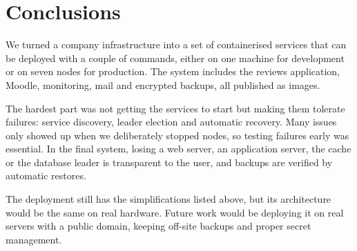 \documentclass[11pt,a4paper]{article}
\begin{document}
\section{Conclusions}

We turned a company infrastructure into a set of containerised services that can be
deployed with a couple of commands, either on one machine for development or on seven
nodes for production. The system includes the reviews application, Moodle, monitoring,
mail and encrypted backups, all published as images.

The hardest part was not getting the services to start but making them tolerate failures:
service discovery, leader election and automatic recovery. Many issues only showed up when
we deliberately stopped nodes, so testing failures early was essential. In the final
system, losing a web server, an application server, the cache or the database leader is
transparent to the user, and backups are verified by automatic restores.

The deployment still has the simplifications listed above, but its architecture would be
the same on real hardware. Future work would be deploying it on real servers with a public
domain, keeping off-site backups and proper secret management.
\end{document}
